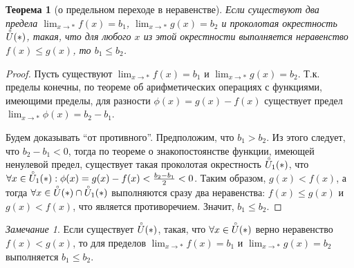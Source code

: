\documentclass[a4paper,12pt]{article} %
\newtheorem{theorem}{Теорема}[section]
\theoremstyle{remark}
\newtheorem*{remark}{Замечание}
\theoremstyle{definition}
\begin{document}
\begin{theorem}[о предельном переходе в неравенстве]
	Если существуют два предела $\lim_{x \to *} f(x) = b_1$, $\lim_{x \to *} g(x) = b_2$ и проколотая окрестность $\accentset{\circ}{U}(*)$, такая, что для любого $x$ из этой окрестности выполняется неравенство $f(x) \le g(x)$, то $b_1\le b_2$.
\end{theorem}
\begin{proof}
	Пусть существуют $\lim_{x \to *} f(x) = b_1$ и $\lim_{x \to *} g(x) = b_2$. Т.к. пределы конечны, по теореме об арифметических операциях с функциями, имеющими пределы, для разности $\phi(x) = g(x) - f(x)$ существует предел $\lim_{x \to *} \phi(x) = b_2-b_1$.

	Будем доказывать ``от противного''. Предположим, что $b_1>b_2$. Из этого следует, что $b_2-b_1<0$, тогда по теореме о знакопостоянстве функции, имеющей ненулевой предел, существует такая проколотая окрестность $\accentset{\circ}{U}_1(*)$, что $\forall x \in  \accentset{\circ}{U}_1(*) : \phi(x) = g(x) - f(x) < \frac{b_2-b_1}{2} < 0$. Таким образом, $g(x) < f(x)$, а тогда $\forall x \in  \accentset{\circ}{U}(*) \cap \accentset{\circ}{U}_1(*)$ выполняются сразу два неравенства: $f(x) \le  g(x)$ и $g(x) < f(x)$, что является противоречием. Значит, $b_1\le b_2$.
\end{proof}

\begin{remark}
	Если существует $\accentset{\circ}{U}(*)$, такая, что $\forall x \in  \accentset{\circ}{U}(*)$ верно неравенство $f(x) < g(x)$, то для пределов $\lim_{x \to *} f(x) = b_1$ и $\lim_{x \to *} g(x) = b_2$ выполняется $b_1\le b_2$.
\end{remark}
\end{document}
